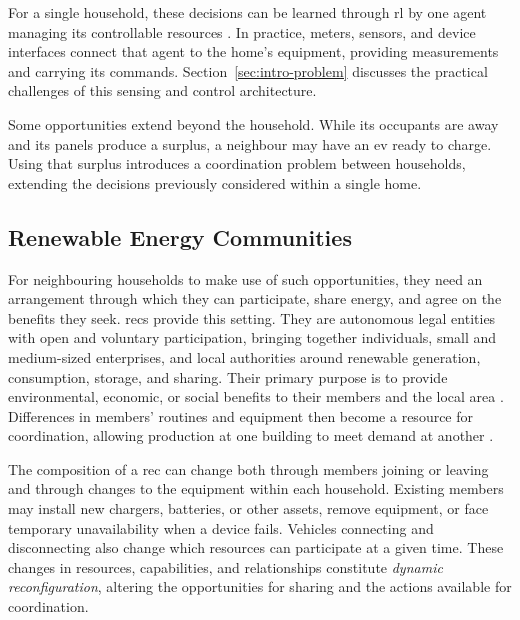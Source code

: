 For a single household, these decisions can be learned through \gls{rl} by one agent managing its controllable resources \parencite{vazquezcanteli2019demandresponse}. In practice, meters, sensors, and device interfaces connect that agent to the home's equipment, providing measurements and carrying its commands. Section~\ref{sec:intro-problem} discusses the practical challenges of this sensing and control architecture.

Some opportunities extend beyond the household. While its occupants are away and its panels produce a surplus, a neighbour may have an \gls{ev} ready to charge. Using that surplus introduces a coordination problem between households, extending the decisions previously considered within a single home.

\subsection{Renewable Energy Communities}
\label{sec:intro-rec}

For neighbouring households to make use of such opportunities, they need an arrangement through which they can participate, share energy, and agree on the benefits they seek. \glspl{rec} provide this setting. They are autonomous legal entities with open and voluntary participation, bringing together individuals, small and medium-sized enterprises, and local authorities around renewable generation, consumption, storage, and sharing. Their primary purpose is to provide environmental, economic, or social benefits to their members and the local area \parencite{eu2018redii,portugal2022electricity}. Differences in members' routines and equipment then become a resource for coordination, allowing production at one building to meet demand at another \parencite{reis2021businessmodels}.

The composition of a \gls{rec} can change both through members joining or leaving and through changes to the equipment within each household. Existing members may install new chargers, batteries, or other assets, remove equipment, or face temporary unavailability when a device fails. Vehicles connecting and disconnecting also change which resources can participate at a given time. These changes in resources, capabilities, and relationships constitute \emph{dynamic reconfiguration}, altering the opportunities for sharing and the actions available for coordination.


